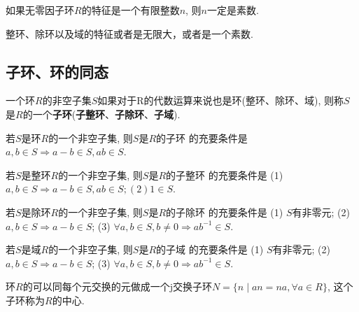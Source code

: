 \begin{Theorem}
如果无零因子环$R$的特征是一个有限整数$n$, 则$n$一定是素数.
\end{Theorem}

\begin{Corollary}
整环、除环以及域的特征或者是无限大，或者是一个素数.
\end{Corollary}


\subsection{子环、环的同态} %

\begin{Definition}[子环]
一个环$R$的非空子集$S$如果对于R的代数运算来说也是环(整环、除环、域), 则称$S$是$R$的一个\textbf{子环}(\textbf{子整环}、\textbf{子除环}、\textbf{子域}).
\end{Definition}

\begin{Theorem}
若$S$是环$R$的一个非空子集, 则$S$是$R$的子环 的充要条件是 $a, b \in S \Rightarrow a-b \in S, ab \in S$.
\end{Theorem}

\begin{Theorem}
若$S$是整环$R$的一个非空子集, 则$S$是$R$的子整环 的充要条件是 (1)$a, b \in S \Rightarrow a-b \in S, ab \in S; (2) \mathfrak{1} \in S$.
\end{Theorem}

\begin{Theorem}
若$S$是除环$R$的一个非空子集, 则$S$是$R$的子除环 的充要条件是 (1) $S$有非零元; (2) $a, b \in S \Rightarrow a-b \in S$; (3) $\forall a, b \in S, b \neq 0 \Rightarrow ab^{-1} \in S$.
\end{Theorem}

\begin{Theorem}
若$S$是域$R$的一个非空子集, 则$S$是$R$的子域 的充要条件是 (1) $S$有非零元; (2) $a, b \in S \Rightarrow a-b \in S$; (3) $\forall a, b \in S, b \neq 0 \Rightarrow ab^{-1} \in S$.
\end{Theorem}

\begin{Proposition}
环$R$的可以同每个元交换的元做成一个j交换子环$N = \{ n \mid a n = na, \forall a \in R\}$, 这个子环称为$R$的中心.
\end{Proposition}

